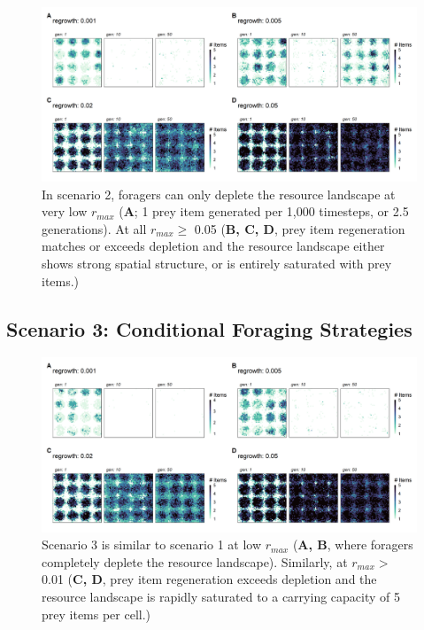 \documentclass[11pt]{article}
\begin{document}
\begin{figure}[h!]
        \centering
        \includegraphics*[width=1.0\textwidth]{figures/fig_landscape_rmax_obligate.png}
        \caption{In scenario 2, foragers can only deplete the resource landscape at very low $r_{max}$ (\textbf{A}; 1 prey item generated per 1,000 timesteps, or 2.5 generations).
        At all $r_{max} \geq$ 0.05 (\textbf{B, C, D}, prey item regeneration matches or exceeds depletion and the resource landscape either shows strong spatial structure, or is entirely saturated with prey items.)}
\end{figure}

\subsection{Scenario 3: Conditional Foraging Strategies}

\begin{figure}[h!]
        \centering
        \includegraphics*[width=1.0\textwidth]{figures/fig_landscape_rmax_facultative.png}
        \caption{Scenario 3 is similar to scenario 1 at low $r_{max}$ (\textbf{A, B}, where foragers completely deplete the resource landscape).
        Similarly, at $r_{max} >$ 0.01 (\textbf{C, D}, prey item regeneration exceeds depletion and the resource landscape is rapidly saturated to a carrying capacity of 5 prey items per cell.)}
\end{figure}
\end{document}
